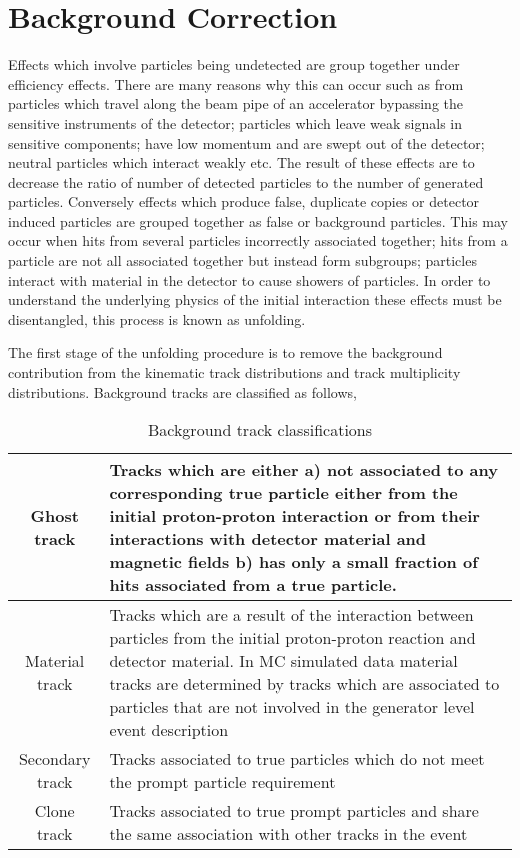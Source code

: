 \section{Background Correction}

Effects which involve particles being undetected are group together under efficiency effects. There are many reasons why this can occur such as from particles which travel along the beam pipe of an accelerator bypassing the sensitive instruments of the detector; particles which leave weak signals in sensitive components; have low momentum and are swept out of the detector; neutral particles which interact weakly etc. The result of these effects are to decrease the ratio of number of detected particles to the number of generated particles. Conversely effects which produce false, duplicate copies or detector induced particles are grouped together as false or background particles. This may occur when hits from several particles incorrectly associated together; hits from a particle are not all associated together but instead form subgroups; particles interact with material in the detector to cause showers of particles. In order to understand the underlying physics of the initial interaction these effects must be disentangled, this process is known as unfolding.

The first stage of the unfolding procedure is to remove the background contribution from the kinematic track distributions and track multiplicity distributions. Background tracks are classified as follows,

\begin{table}[htdp]
	\caption{Background track classifications}
		\begin{center}
			\begin{tabular}{|c|p{}|}
				\hline
				Ghost track & Tracks which are either a) not associated to any corresponding true particle either from the initial proton-proton interaction or from their interactions with detector material and magnetic fields b) has only a small fraction of hits associated from a true particle.  \\
				\hline
				 Material track & Tracks which are a result of the interaction between particles from the initial proton-proton reaction and detector material. In MC simulated data material tracks are determined by tracks which are associated to particles that are not involved in the generator level event description \\
				 \hline
				 Secondary track & Tracks associated to true particles which do not meet the prompt particle requirement \\
				 \hline
				 Clone track & Tracks associated to true prompt particles and share the same association with other tracks in the event \\
				\hline
			\end{tabular}
		\end{center}
	\label{default}
\end{table}%

